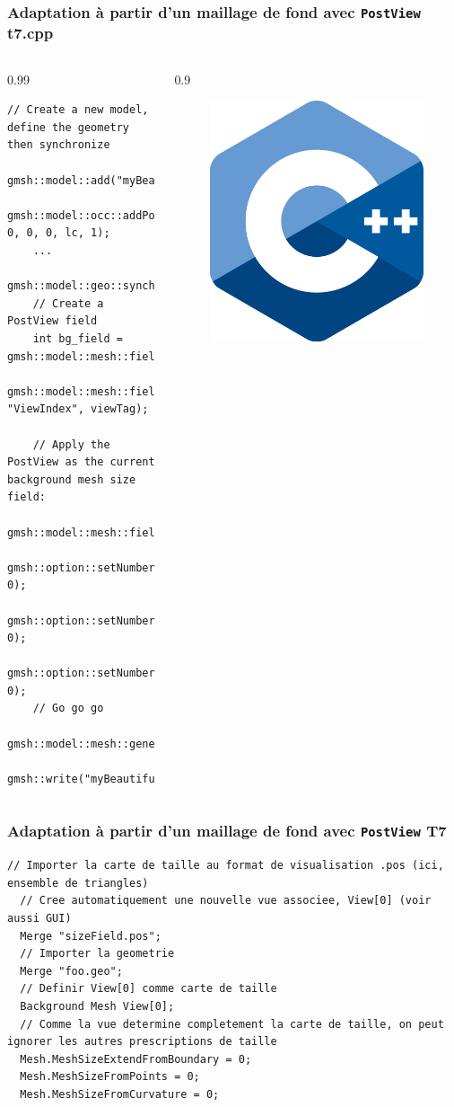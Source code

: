 \documentclass[aspectratio=169]{beamer}
\begin{document}
\begin{frame}[fragile]
\frametitle{Adaptation à partir d'un maillage de fond avec \texttt{PostView} \hfill t7.cpp}
\begin{columns}
  \begin{column}{0.99\linewidth}
  \begin{lstlisting}[frame=none, aboveskip=1mm]
    // Create a new model, define the geometry then synchronize
    gmsh::model::add("myBeautifulModel");
    gmsh::model::occ::addPoint( 0, 0, 0, lc, 1);
    ...
    gmsh::model::geo::synchronize();
    // Create a PostView field
    int bg_field = gmsh::model::mesh::field::add("PostView");
    gmsh::model::mesh::field::setNumber(bg_field, "ViewIndex", viewTag);

    // Apply the PostView as the current background mesh size field:
    gmsh::model::mesh::field::setAsBackgroundMesh(bg_field);
    gmsh::option::setNumber("Mesh.MeshSizeExtendFromBoundary", 0);
    gmsh::option::setNumber("Mesh.MeshSizeFromPoints", 0);
    gmsh::option::setNumber("Mesh.MeshSizeFromCurvature", 0);
    // Go go go
    gmsh::model::mesh::generate(2);
    gmsh::write("myBeautifulMesh.msh");
  \end{lstlisting}
  \end{column}
  \begin{column}{0.9\linewidth}
    \begin{figure}
      \vspace{-5.5cm}
      \hspace{-10cm}
      \includegraphics[width=0.1\linewidth]{figures/cpp.png}
      \caption{}
    \end{figure}
  \end{column}
\end{columns}
\end{frame}

\begin{frame}[fragile]
\frametitle{Adaptation à partir d'un maillage de fond avec \texttt{PostView} \hfill T7}
\begin{lstlisting}[frame=none, aboveskip=10mm]
  // Importer la carte de taille au format de visualisation .pos (ici, ensemble de triangles)
  // Cree automatiquement une nouvelle vue associee, View[0] (voir aussi GUI)
  Merge "sizeField.pos";
  // Importer la geometrie
  Merge "foo.geo";
  // Definir View[0] comme carte de taille
  Background Mesh View[0];
  // Comme la vue determine completement la carte de taille, on peut ignorer les autres prescriptions de taille
  Mesh.MeshSizeExtendFromBoundary = 0;
  Mesh.MeshSizeFromPoints = 0;
  Mesh.MeshSizeFromCurvature = 0;
\end{lstlisting}
\end{frame}
\end{document}
